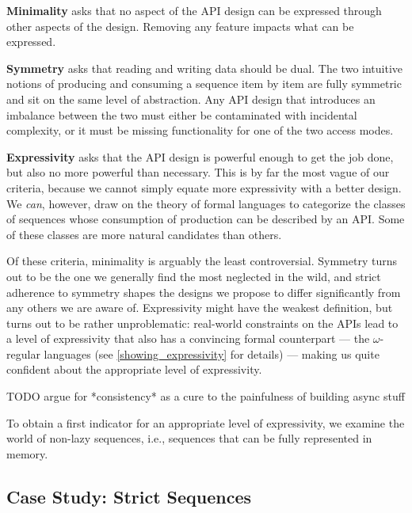 \documentclass[sigplan,screen,10pt,anonymous,review]{acmart}
\begin{document}
\textbf{Minimality} asks that no aspect of the API design can be expressed through other aspects of the design. Removing any feature impacts what can be expressed.


\textbf{Symmetry} asks that reading and writing data should be dual. The two intuitive notions of producing and consuming a sequence item by item are fully symmetric and sit on the same level of abstraction. Any API design that introduces an imbalance between the two must either be contaminated with incidental complexity, or it must be missing functionality for one of the two access modes.

\textbf{Expressivity} asks that the API design is powerful enough to get the job done, but also no more powerful than necessary. This is by far the most vague of our criteria, because we cannot simply equate more expressivity with a better design. We \textit{can}, however, draw on the theory of formal languages to categorize the classes of sequences whose consumption of production can be described by an API. Some of these classes are more natural candidates than others.

Of these criteria, minimality is arguably the least controversial. Symmetry turns out to be the one we generally find the most neglected in the wild, and strict adherence to symmetry shapes the designs we propose to differ significantly from any others we are aware of. Expressivity might have the weakest definition, but turns out to be rather unproblematic: real-world constraints on the APIs lead to a level of expressivity that also has a convincing formal counterpart --- the $\omega$-regular languages (see \cref{showing_expressivity} for details) --- making us quite confident about the appropriate level of expressivity.

TODO argue for *consistency* as a cure to the painfulness of building async stuff

To obtain a first indicator for an appropriate level of expressivity, we examine the world of non-lazy sequences, i.e., sequences that can be fully represented in memory.

\subsection{Case Study: Strict Sequences}\label{strict_sequences}
\end{document}
